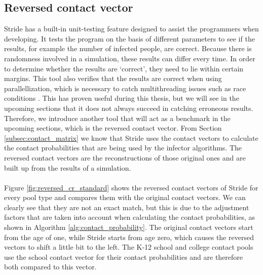 \subsection{Reversed contact vector}
\label{subsec:reversed_contact_vector}
Stride has a built-in unit-testing feature designed to assist the programmers when developing. It tests the program on the basis of different parameters to see if the results, for example the number of infected people, are correct. Because there is randomness involved in a simulation, these results can differ every time. In order to determine whether the results are `correct', they need to lie within certain margins. This tool also verifies that the results are correct when using parallellization, which is necessary to catch multithreading issues such as race conditions \cite{race_condition}. This has proven useful during this thesis, but we will see in the upcoming sections that it does not always succeed in catching erroneous results. Therefore, we introduce another tool that will act as a benchmark in the upcoming sections, which is the reversed contact vector. From Section \ref{subsec:contact_matrix} we know that Stride uses the contact vectors to calculate the contact probabilities that are being used by the infector algorithms. The reversed contact vectors are the reconstructions of those original ones and are built up from the results of a simulation.
\\\\
Figure \ref{fig:reversed_cr_standard} shows the reversed contact vectors of Stride for every pool type and compares them with the original contact vectors. We can clearly see that they are not an exact match, but this is due to the adjustment factors that are taken into account when calculating the contact probabilities, as shown in Algorithm \ref{alg:contact_probability}. The original contact vectors start from the age of one, while Stride starts from age zero, which causes the reversed vectors to shift a little bit to the left. The K-12 school and college contact pools use the school contact vector for their contact probabilities and are therefore both compared to this vector.
\\\\
